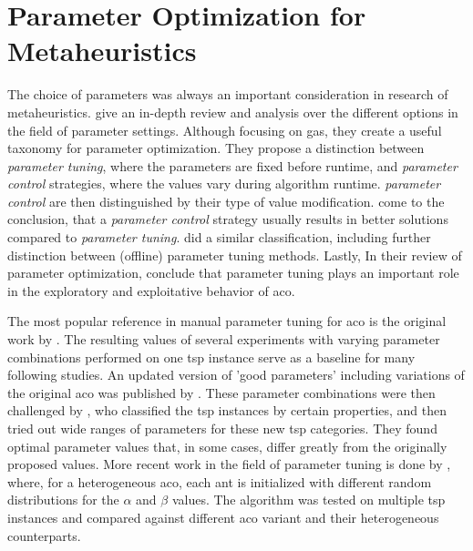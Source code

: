 \section{Parameter Optimization for Metaheuristics}
\label{chap:paramopt}

The choice of parameters was always an important consideration in research of metaheuristics. \citet{eiben1999parameter} give an in-depth review and analysis over the different options in the field of parameter settings. Although focusing on \glspl{ga}, they create a useful taxonomy for parameter optimization. They propose a distinction between \textit{parameter tuning}, where the parameters are fixed before runtime, and \textit{parameter control} strategies, where the values vary during algorithm runtime. \textit{parameter control} are then distinguished by their type of value modification. \citeauthor{eiben1999parameter} come to the conclusion, that a \textit{parameter control} strategy usually results in better solutions compared to \textit{parameter tuning}. \citet{talbi2009metaheuristics} did a similar classification, including further distinction between (offline) parameter tuning methods.
Lastly, In their review of parameter optimization, \citet{wong2008parameter} conclude that parameter tuning plays an important role in the exploratory and exploitative behavior of \gls{aco}.

The most popular reference in manual parameter tuning for \gls{aco} is the original work by \citeauthor{dorigo1991ant}  \cite{dorigo1991ant,dorigo1996ant}. The resulting values of several experiments with varying parameter combinations performed on one \gls{tsp} instance serve as a baseline for many following studies. An updated version of 'good parameters' including variations of the original \gls{aco} was published by \citet{dorigo2004ant}.
These parameter combinations were then challenged by \citet{gaertner2005optimal}, who classified the \gls{tsp} instances by certain properties, and then tried out wide ranges of parameters for these new \gls{tsp} categories. They found optimal parameter values that, in some cases, differ greatly from the originally proposed values.
More recent work in the field of parameter tuning is done by \citet{tuani2018h}, where, for a heterogeneous \gls{aco}, each ant is initialized with different random distributions for the $\alpha$ and $\beta$ values. The algorithm was tested on multiple \gls{tsp} instances and compared against different \gls{aco} variant and their heterogeneous counterparts.

